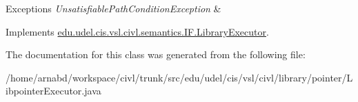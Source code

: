 \begin{DoxyExceptions}{Exceptions}
{\em Unsatisfiable\+Path\+Condition\+Exception} & \\
\hline
\end{DoxyExceptions}


Implements \hyperlink{interfaceedu_1_1udel_1_1cis_1_1vsl_1_1civl_1_1semantics_1_1IF_1_1LibraryExecutor_a383136ab6e875742f46b5dbd94673984}{edu.\+udel.\+cis.\+vsl.\+civl.\+semantics.\+I\+F.\+Library\+Executor}.



The documentation for this class was generated from the following file\+:\begin{DoxyCompactItemize}
\item 
/home/arnabd/workspace/civl/trunk/src/edu/udel/cis/vsl/civl/library/pointer/Libpointer\+Executor.\+java\end{DoxyCompactItemize}
